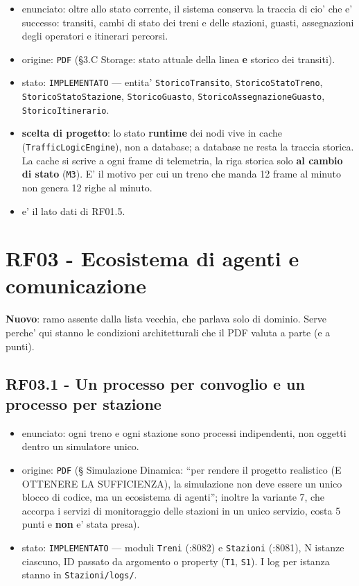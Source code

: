 \documentclass[11pt]{article}
\begin{document}
\begin{itemize}
\item enunciato: oltre allo stato corrente, il sistema conserva la traccia di cio' che e' successo:
transiti, cambi di stato dei treni e delle stazioni, guasti, assegnazioni degli operatori e
itinerari percorsi.
\item origine: \texttt{PDF} (§3.C Storage: stato attuale della linea \textbf{e} storico dei transiti).
\item stato: \texttt{IMPLEMENTATO} — entita' \texttt{StoricoTransito}, \texttt{StoricoStatoTreno}, \texttt{StoricoStatoStazione},
\texttt{StoricoGuasto}, \texttt{StoricoAssegnazioneGuasto}, \texttt{StoricoItinerario}.
\item \textbf{scelta di progetto}: lo stato \textbf{runtime} dei nodi vive in cache (\texttt{TrafficLogicEngine}), non a
database; a database ne resta la traccia storica. La cache si scrive a ogni frame di telemetria,
la riga storica solo \textbf{al cambio di stato} (\texttt{M3}). E' il motivo per cui un treno che manda 12 frame
al minuto non genera 12 righe al minuto.
\item e' il lato dati di RF01.5.
\end{itemize}
\section{RF03 - Ecosistema di agenti e comunicazione}
\label{sec:orgddbe3ab}

\textbf{Nuovo}: ramo assente dalla lista vecchia, che parlava solo di dominio. Serve perche' qui stanno le
condizioni architetturali che il PDF valuta a parte (e a punti).
\subsection{RF03.1 - Un processo per convoglio e un processo per stazione}
\label{sec:org2848417}
\begin{itemize}
\item enunciato: ogni treno e ogni stazione sono processi indipendenti, non oggetti dentro un
simulatore unico.
\item origine: \texttt{PDF} (§ Simulazione Dinamica: ``per rendere il progetto realistico (E OTTENERE LA
SUFFICIENZA), la simulazione non deve essere un unico blocco di codice, ma un ecosistema di
agenti''; inoltre la variante 7, che accorpa i servizi di monitoraggio delle stazioni in un unico
servizio, costa 5 punti e \textbf{non} e' stata presa).
\item stato: \texttt{IMPLEMENTATO} — moduli \texttt{Treni} (:8082) e \texttt{Stazioni} (:8081), N istanze ciascuno, ID passato
da argomento o property (\texttt{T1}, \texttt{S1}). I log per istanza stanno in \texttt{Stazioni/logs/}.
\end{itemize}
\end{document}
